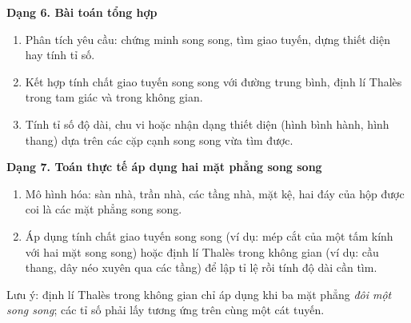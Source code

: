 \textbf{Dạng 6. Bài toán tổng hợp}
\begin{enumerate}
\item Phân tích yêu cầu: chứng minh song song, tìm giao tuyến, dựng thiết diện hay tính tỉ số.
\item Kết hợp tính chất giao tuyến song song với đường trung bình, định lí Thalès trong tam giác và trong không gian.
\item Tính tỉ số độ dài, chu vi hoặc nhận dạng thiết diện (hình bình hành, hình thang) dựa trên các cặp cạnh song song vừa tìm được.
\end{enumerate}

\textbf{Dạng 7. Toán thực tế áp dụng hai mặt phẳng song song}
\begin{enumerate}
\item Mô hình hóa: sàn nhà, trần nhà, các tầng nhà, mặt kệ, hai đáy của hộp được coi là các mặt phẳng song song.
\item Áp dụng tính chất giao tuyến song song (ví dụ: mép cắt của một tấm kính với hai mặt song song) hoặc định lí Thalès trong không gian (ví dụ: cầu thang, dây néo xuyên qua các tầng) để lập tỉ lệ rồi tính độ dài cần tìm.
\end{enumerate}
Lưu ý: định lí Thalès trong không gian chỉ áp dụng khi ba mặt phẳng \emph{đôi một song song}; các tỉ số phải lấy tương ứng trên cùng một cát tuyến.
